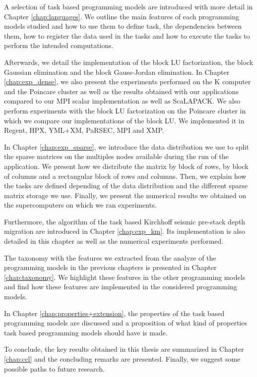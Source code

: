 A selection of task based programming models are introduced with more detail in Chapter \ref{chap:languages}.
We outline the main features of each programming models studied and how to use them to define task, the dependencies between them, how to register the data used in the tasks and how to execute the tasks to perform the intended computations.

Afterwards, we detail the implementation of the block LU factorization, the block Gaussian elimination and the block Gauss-Jordan elimination.
In Chapter \ref{chap:exp_dense}, we also present the experiments performed on the K computer and the Poincare cluster as well as the results obtained with our applications compared to our MPI scalar implementation as well as ScaLAPACK.
We also perform experiments with the block LU factorization on the Poincare cluster in which we compare our implementations of the block LU.
We implemented it in Regent, HPX, YML+XM, PaRSEC, MPI and XMP.

In Chapter \ref{chap:exp_sparse}, we introduce the data distribution we use to split the sparse matrices on the multiples nodes available during the run of the application.
We present how we distribute the matrix by block of rows, by block of columns and a rectangular block of rows and columns.
Then, we explain how the tasks are defined depending of the data distribution and the different sparse matrix storage we use.
Finally, we present the numerical results we obtained on the supercomputers on which we ran experiments.

Furthermore, the algorithm of the task based Kirchhoff seismic pre-stack depth migration are introduced in Chapter \ref{chap:exp_km}.
Its implementation is also detailed in this chapter as well as the numerical experiments performed.

The taxonomy with the features we extracted from the analyze of the programming models in the previous chapters is presented in Chapter \ref{chap:taxonomy}.
We highlight these features in the other programming models and find how these features are implemented in the considered programming models.

In Chapter \ref{chap:properties+extension}, the properties of the task based programming models are discussed and a proposition of what kind of properties task based programming models should have is made.

To conclude, the key results obtained in this thesis are summarized in Chapter \ref{chap:ccl} and the concluding remarks are presented.
Finally, we suggest some possible paths to future research.
